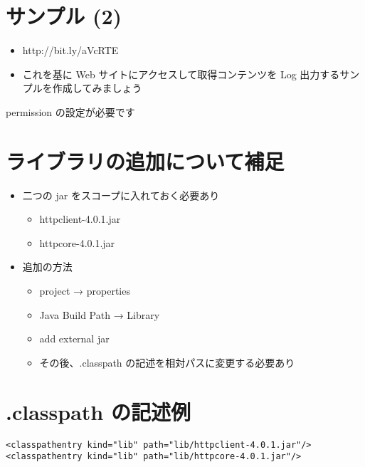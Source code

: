 \documentclass[slide,papersize]{jsarticle}
\begin{document}
\section*{サンプル (2)}
\bigskip
\begin{itemize}
\item http://bit.ly/aVcRTE
\bigskip
\item これを基に Web サイトにアクセスして取得コンテンツを Log 出力するサンプルを作成してみましょう
\end{itemize}
permission の設定が必要です

\section*{ライブラリの追加について補足}
\begin{itemize}
\item 二つの jar をスコープに入れておく必要あり
 \begin{itemize}
 \item {\footnotesize httpclient-4.0.1.jar}
 \item {\footnotesize httpcore-4.0.1.jar}
 \end{itemize}
\item 追加の方法
 \begin{itemize}
 \item project → properties
 \item Java Build Path → Library
 \item add external jar
 \item {\footnotesize その後、.classpath の記述を相対パスに変更する必要あり}
 \end{itemize}
\end{itemize}

\section*{.classpath の記述例}
{\tiny
\begin{verbatim}
<classpathentry kind="lib" path="lib/httpclient-4.0.1.jar"/>
<classpathentry kind="lib" path="lib/httpcore-4.0.1.jar"/>
\end{verbatim}
}
\end{document}
